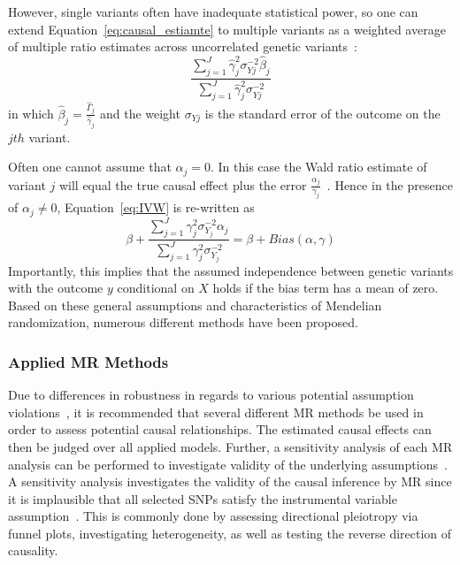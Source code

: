 However, single variants often have inadequate statistical power, so one can extend Equation~\ref{eq:causal_estiamte} to multiple variants as a weighted average of multiple ratio estimates across uncorrelated genetic variants~\cite{Bowden2015}:
\begin{equation} \label{eq:IVW}
  \frac{\sum^J_{j=1} \hat{\gamma}_j^2\sigma_{Yj}^{-2} \hat{\beta}_j}
  {\sum^J_{j=1} \hat{\gamma}_j^2\sigma_{Yj}^{-2}}
\end{equation}
in which $\hat{\beta}_j = \frac{\hat{\Gamma}_j}{\hat{\gamma}_j}$ and the weight $\sigma_{Yj}$ is the standard error of the outcome on the $jth$ variant.

Often one cannot assume that $\alpha_j = 0$.
In this case the Wald ratio estimate of variant $j$ will equal the true causal effect plus the error $\frac{\alpha_j}{\gamma_j}$~\cite{Bowden2015}. 
Hence in the presence of $\alpha_j \neq 0$, Equation~\ref{eq:IVW} is re-written as
\begin{equation} \label{eq:TSLSbias}
  \beta + \frac{\sum^J_{j=1} \gamma_j^2\sigma_{Y_j}^{-2} \alpha_j}
  {\sum^J_{j=1} \gamma_j^2\sigma_{Y_j}^{-2}} = \beta + Bias(\alpha, \gamma)
\end{equation}
Importantly, this implies that the assumed independence between genetic variants with the outcome $y$ conditional on $X$ holds if the bias term has a mean of zero.
Based on these general assumptions and characteristics of Mendelian randomization, numerous different methods have been proposed.

\subsubsection{Applied MR Methods}
\label{ssub:Used_Methods}

Due to differences in robustness in regards to various potential assumption violations~\citet{Burgess2016}, it is recommended that several different MR methods be used in order to assess potential causal relationships.
The estimated causal effects can then be judged over all  applied models.
Further, a sensitivity analysis of each MR analysis can be performed to investigate validity of the underlying assumptions~\cite{Burgess2016}.
A sensitivity analysis investigates the validity of the causal inference by MR since it is implausible that all selected SNPs satisfy the instrumental variable assumption~\cite{Burgess2016}.
This is commonly done by assessing directional pleiotropy via funnel plots, investigating heterogeneity, as well as testing the reverse direction of causality.

